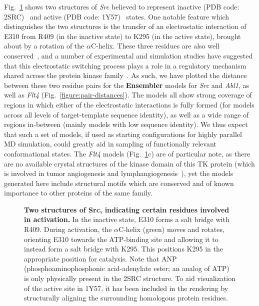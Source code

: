 \documentclass[aps,prl,preprint,nofootinbib,superscriptaddress,linenumbers]{revtex4-1}
\begin{document}
Fig.~\ref{figure:src-ref-structures} shows two structures of \emph{Src} believed to represent inactive (PDB code: 2SRC)~\cite{xu:1999:2src} and active (PDB code: 1Y57)~\cite{cowan-jacob:2005:1y57} states.
One notable feature which distinguishes the two structures is the transfer of an electrostatic interaction of E310 from R409 (in the inactive state) to K295 (in the active state), brought about by a rotation of the $\alpha$C-helix.
These three residues are also well conserved~\cite{kannan:jmb:2005:kinase-regulation}, and a number of experimental and simulation studies have suggested that this electrostatic switching process plays a role in a regulatory mechanism shared across the protein kinase family~\cite{shukla-pande:nature-commun:2014:src-activation-msm, foda:nat-comm:2015:src, ozkirimli:prot-sci:2008:src}.
As such, we have plotted the distance between these two residue pairs for the {\bf Ensembler} models for \emph{Src} and \emph{Abl1}, as well as \emph{Flt4} (Fig.~\ref{figure:pair-distances}).
The models all show strong coverage of regions in which either of the electrostatic interactions is fully formed (for models across all levels of target-template sequence identity), as well as a wide range of regions in-between (mainly models with low sequence identity).
We thus expect that such a set of models, if used as starting configurations for highly parallel MD simulation, could greatly aid in sampling of functionally relevant conformational states.
The \emph{Flt4} models (Fig.~\ref{figure:src-ref-structures}c) are of particular note, as there are no available crystal structures of the kinase domain of this TK protein (which is involved in tumor angiogenesis and lymphangiogenesis~\cite{Su:2006:flt4cancer}), yet the models generated here include structural motifs which are conserved and of known importance to other proteins of the same family.


\begin{figure}[tb]

    \caption{{\bf Two structures of Src, indicating certain residues involved in activation.}
    In the inactive state, E310 forms a salt bridge with R409.
    During activation, the $\alpha$C-helix (green) moves and rotates, orienting E310 towards the ATP-binding site and allowing it to instead form a salt bridge with K295.
    This positions K295 in the appropriate position for catalysis.
    Note that ANP (phosphoaminophosphonic acid-adenylate ester; an analog of ATP) is only physically present in the 2SRC structure.
    To aid visualization of the active site in 1Y57, it has been included in the rendering by structurally aligning the surrounding homologous protein residues.
  \label{figure:src-ref-structures}
  }
\end{figure}
\end{document}
